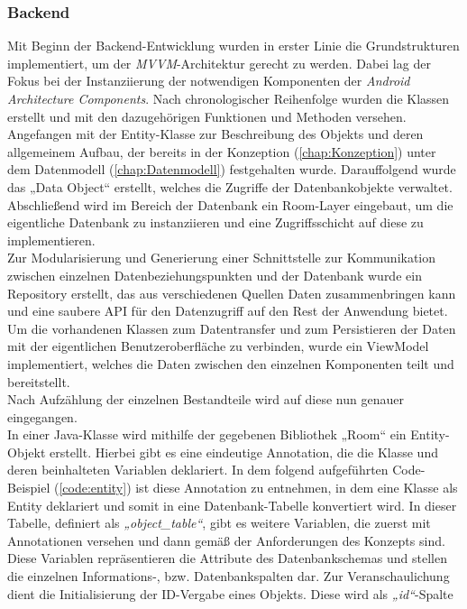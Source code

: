 \subsubsection{Backend}
Mit Beginn der Backend-Entwicklung wurden in erster Linie die Grundstrukturen implementiert, um der \textit{MVVM}-Architektur gerecht zu werden. Dabei lag 
der Fokus bei der Instanziierung der notwendigen Komponenten der \textit{Android Architecture Components}. Nach chronologischer Reihenfolge wurden die Klassen 
erstellt und mit den dazugehörigen Funktionen und Methoden versehen. Angefangen mit der Entity-Klasse zur Beschreibung des Objekts und deren allgemeinem Aufbau, 
der bereits in der Konzeption (\ref{chap:Konzeption}) unter dem Datenmodell (\ref{chap:Datenmodell}) festgehalten wurde. Darauffolgend wurde das „Data Object“ 
erstellt, welches die Zugriffe der Datenbankobjekte verwaltet. Abschließend wird im Bereich der Datenbank ein Room-Layer eingebaut, um die eigentliche Datenbank zu 
instanziieren und eine Zugriffsschicht auf diese zu implementieren. 
\\ 
Zur Modularisierung und Generierung einer Schnittstelle zur Kommunikation zwischen einzelnen Datenbeziehungspunkten und der Datenbank wurde ein Repository erstellt, 
das aus verschiedenen Quellen Daten zusammenbringen kann und eine saubere \acs{API} für den Datenzugriff auf den Rest der Anwendung bietet. 
Um die vorhandenen Klassen zum Datentransfer und zum Persistieren der Daten mit der 
eigentlichen Benutzeroberfläche zu verbinden, wurde ein ViewModel implementiert, welches die Daten zwischen den einzelnen Komponenten teilt und bereitstellt. 
\\ 
\linebreak 
Nach Aufzählung der einzelnen Bestandteile wird auf diese nun genauer eingegangen. 
\\ 
\linebreak
In einer Java-Klasse wird mithilfe der gegebenen Bibliothek „Room“ ein Entity-Objekt erstellt. Hierbei gibt es eine eindeutige Annotation, die die Klasse und 
deren beinhalteten Variablen deklariert. In dem folgend aufgeführten Code-Beispiel (\ref{code:entity}) ist diese Annotation zu entnehmen, in dem eine Klasse als 
Entity deklariert und somit in eine Datenbank-Tabelle konvertiert wird. 
In dieser Tabelle, definiert als \textit{„object\_table“}, gibt es weitere Variablen, die zuerst mit Annotationen versehen und dann gemäß der Anforderungen des 
Konzepts sind. Diese Variablen repräsentieren die Attribute des Datenbankschemas und stellen die einzelnen 
Informations-, bzw. Datenbankspalten dar. Zur Veranschaulichung dient die Initialisierung der \acs{ID}-Vergabe eines Objekts. Diese wird als \textit{„id“}-Spalte 

